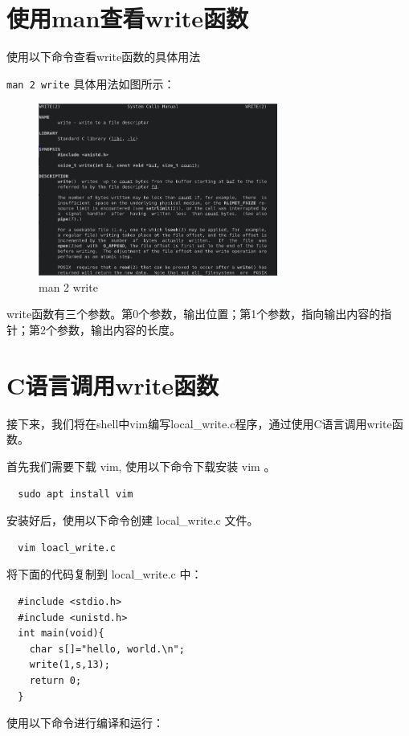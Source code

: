 \documentclass[lang=cn,10pt]{elegantbook}
\begin{document}
\section{使用man查看write函数}
使用以下命令查看write函数的具体用法

\lstinline{man 2 write}
具体用法如图所示：
\begin{figure}[htbp]
  \centering
  \includegraphics[width=0.7\textwidth]{image/image-20231105133327813.png}
  \caption{man 2 write}
\end{figure}

write函数有三个参数。第0个参数，输出位置；第1个参数，指向输出内容的指针；第2个参数，输出内容的长度。

\section{C语言调用write函数}
接下来，我们将在shell中vim编写local\_write.c程序，通过使用C语言调用write函数。

首先我们需要下载 vim, 使用以下命令下载安装 vim 。

\begin{lstlisting}
  sudo apt install vim
\end{lstlisting}

安装好后，使用以下命令创建 local\_write.c 文件。

\begin{lstlisting}
  vim loacl_write.c
\end{lstlisting}

将下面的代码复制到 local\_write.c 中：

\begin{lstlisting}
  #include <stdio.h>
  #include <unistd.h>
  int main(void){
    char s[]="hello, world.\n";
    write(1,s,13);
    return 0;
  }
\end{lstlisting}

使用以下命令进行编译和运行：
\end{document}
